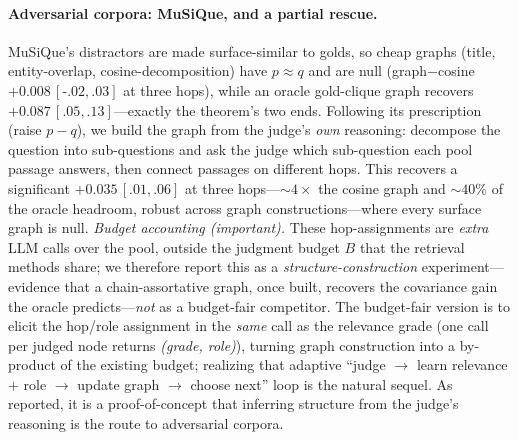 \documentclass[11pt]{article}
\theoremstyle{plain}\newtheorem{theorem}{Theorem}\newtheorem{lemma}{Lemma}\newtheorem{proposition}{Proposition}
\theoremstyle{definition}\newtheorem{assumption}{Assumption}\newtheorem{remark}{Remark}
\begin{document}
\paragraph{Adversarial corpora: MuSiQue, and a partial rescue.} MuSiQue's distractors are made surface-similar to
golds, so cheap graphs (title, entity-overlap, cosine-decomposition) have $p\approx q$ and are null
(graph$-$cosine $+0.008\,[\text{-}.02,.03]$ at three hops), while an oracle gold-clique graph recovers
$+0.087\,[.05,.13]$---exactly the theorem's two ends. Following its prescription (raise $p-q$), we build the graph
from the judge's \emph{own} reasoning: decompose the question into sub-questions and ask the judge which
sub-question each pool passage answers, then connect passages on different hops. This recovers a significant
$+0.035\,[.01,.06]$ at three hops---$\sim4\times$ the cosine graph and $\sim40\%$ of the oracle headroom, robust
across graph constructions---where every surface graph is null. \emph{Budget accounting (important).} These
hop-assignments are \emph{extra} LLM calls over the pool, outside the judgment budget $B$ that the retrieval
methods share; we therefore report this as a \emph{structure-construction} experiment---evidence that a
chain-assortative graph, once built, recovers the covariance gain the oracle predicts---\emph{not} as a
budget-fair competitor. The budget-fair version is to elicit the hop/role assignment in the \emph{same} call as
the relevance grade (one call per judged node returns \emph{(grade, role)}), turning graph construction into a
by-product of the existing budget; realizing that adaptive ``judge $\to$ learn relevance $+$ role $\to$ update
graph $\to$ choose next'' loop is the natural sequel. As reported, it is a proof-of-concept that inferring
structure from the judge's reasoning is the route to adversarial corpora.
\end{document}
